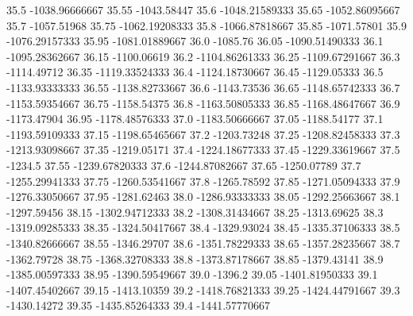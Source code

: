            35.5   -1038.96666667
          35.55      -1043.58447
           35.6   -1048.21589333
          35.65   -1052.86095667
           35.7      -1057.51968
          35.75   -1062.19208333
           35.8   -1066.87818667
          35.85      -1071.57801
           35.9   -1076.29157333
          35.95   -1081.01889667
           36.0         -1085.76
          36.05   -1090.51490333
           36.1   -1095.28362667
          36.15      -1100.06619
           36.2   -1104.86261333
          36.25   -1109.67291667
           36.3      -1114.49712
          36.35   -1119.33524333
           36.4   -1124.18730667
          36.45      -1129.05333
           36.5   -1133.93333333
          36.55   -1138.82733667
           36.6      -1143.73536
          36.65   -1148.65742333
           36.7   -1153.59354667
          36.75      -1158.54375
           36.8   -1163.50805333
          36.85   -1168.48647667
           36.9      -1173.47904
          36.95   -1178.48576333
           37.0   -1183.50666667
          37.05      -1188.54177
           37.1   -1193.59109333
          37.15   -1198.65465667
           37.2      -1203.73248
          37.25   -1208.82458333
           37.3   -1213.93098667
          37.35      -1219.05171
           37.4   -1224.18677333
          37.45   -1229.33619667
           37.5          -1234.5
          37.55   -1239.67820333
           37.6   -1244.87082667
          37.65      -1250.07789
           37.7   -1255.29941333
          37.75   -1260.53541667
           37.8      -1265.78592
          37.85   -1271.05094333
           37.9   -1276.33050667
          37.95      -1281.62463
           38.0   -1286.93333333
          38.05   -1292.25663667
           38.1      -1297.59456
          38.15   -1302.94712333
           38.2   -1308.31434667
          38.25      -1313.69625
           38.3   -1319.09285333
          38.35   -1324.50417667
           38.4      -1329.93024
          38.45   -1335.37106333
           38.5   -1340.82666667
          38.55      -1346.29707
           38.6   -1351.78229333
          38.65   -1357.28235667
           38.7      -1362.79728
          38.75   -1368.32708333
           38.8   -1373.87178667
          38.85      -1379.43141
           38.9   -1385.00597333
          38.95   -1390.59549667
           39.0          -1396.2
          39.05   -1401.81950333
           39.1   -1407.45402667
          39.15      -1413.10359
           39.2   -1418.76821333
          39.25   -1424.44791667
           39.3      -1430.14272
          39.35   -1435.85264333
           39.4   -1441.57770667
